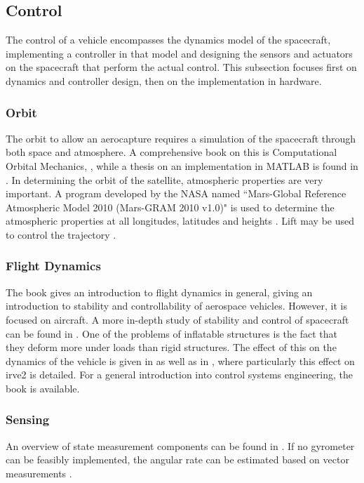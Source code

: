 \subsection{Control} \label{sec:control}
The control of a vehicle encompasses the dynamics model of the spacecraft, implementing a controller in that model and designing the sensors and actuators on the spacecraft that perform the actual control. This subsection focuses first on dynamics and controller design, then on the implementation in hardware.

\subsubsection{Orbit}
The orbit to allow an aerocapture requires a simulation of the spacecraft through both space and atmosphere. A comprehensive book on this is Computational Orbital Mechanics, \cite{Weiland2004}, while a thesis on an implementation in MATLAB is found in \cite{Leszczynski1998}. In determining the orbit of the satellite, atmospheric properties are very important. A program developed by the NASA named ``Mars-Global Reference Atmospheric Model 2010 (Mars-GRAM 2010 v1.0)" is used to determine the atmospheric properties at all longitudes, latitudes and heights \cite{Justus2001}. Lift may be used to control the trajectory \cite{Esmaelzadeh2010}.

\subsubsection{Flight Dynamics}
The book \cite{Mulder2013} gives an introduction to flight dynamics in general, giving an introduction to stability and controllability of aerospace vehicles. However, it is focused on aircraft. A more in-depth study of stability and control of spacecraft can be found in \cite{Steketee1967, Ito2002}. One of the problems of inflatable structures is the fact that they deform more under loads than rigid structures. The effect of this on the dynamics of the vehicle is given in \cite{Axdahl2009} as well as in \cite{Bose2009}, where particularly this effect on \gls{irve2} is detailed. For a general introduction into control systems engineering, the book \cite{Nise2011} is available.

\subsubsection{Sensing}
An overview of state measurement components can be found in \cite{Wertz2011}. If no gyrometer can be feasibly implemented, the angular rate can be estimated based on vector measurements \cite{Azor1998}.

